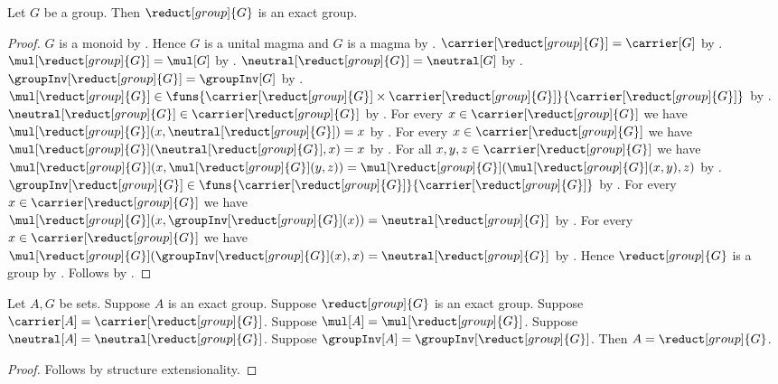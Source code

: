 \begin{theorem}\label{group_reduct_is_exact_group}
    Let $G$ be a group.
    Then $\reduct[group]{G}$ is an exact group.
\end{theorem}
\begin{proof}
    $G$ is a monoid by .
    Hence $G$ is a unital magma and $G$ is a magma by
        .
    $\carrier[\reduct[group]{G}]=\carrier[G]$ by
        .
    $\mul[\reduct[group]{G}]=\mul[G]$ by
        .
    $\neutral[\reduct[group]{G}]=\neutral[G]$ by
        .
    $\groupInv[\reduct[group]{G}]=\groupInv[G]$ by
        .
    $\mul[\reduct[group]{G}]\in
        \funs{\carrier[\reduct[group]{G}]\times
            \carrier[\reduct[group]{G}]}{
            \carrier[\reduct[group]{G}]}$ by
        .
    $\neutral[\reduct[group]{G}]\in
        \carrier[\reduct[group]{G}]$ by
        .
    For every $x\in\carrier[\reduct[group]{G}]$ we have
        $\mul[\reduct[group]{G}](x,
            \neutral[\reduct[group]{G}])=x$ by
        .
    For every $x\in\carrier[\reduct[group]{G}]$ we have
        $\mul[\reduct[group]{G}](
            \neutral[\reduct[group]{G}],x)=x$ by
        .
    For all $x,y,z\in\carrier[\reduct[group]{G}]$ we have
        $\mul[\reduct[group]{G}](x,
            \mul[\reduct[group]{G}](y,z))=
            \mul[\reduct[group]{G}](
                \mul[\reduct[group]{G}](x,y),z)$ by
        .
    $\groupInv[\reduct[group]{G}]\in
        \funs{\carrier[\reduct[group]{G}]}{
            \carrier[\reduct[group]{G}]}$ by
        .
    For every $x\in\carrier[\reduct[group]{G}]$ we have
        $\mul[\reduct[group]{G}](x,
            \groupInv[\reduct[group]{G}](x))=
            \neutral[\reduct[group]{G}]$ by
        .
    For every $x\in\carrier[\reduct[group]{G}]$ we have
        $\mul[\reduct[group]{G}](
            \groupInv[\reduct[group]{G}](x),x)=
            \neutral[\reduct[group]{G}]$ by
        .
    Hence $\reduct[group]{G}$ is a group by
        .
    Follows by .
\end{proof}

\begin{theorem}\label{exact_group_eq_exact_group_reduct}
    Let $A,G$ be sets.
    Suppose $A$ is an exact group.
    Suppose $\reduct[group]{G}$ is an exact group.
    Suppose $\carrier[A]=\carrier[\reduct[group]{G}]$.
    Suppose $\mul[A]=\mul[\reduct[group]{G}]$.
    Suppose $\neutral[A]=\neutral[\reduct[group]{G}]$.
    Suppose $\groupInv[A]=\groupInv[\reduct[group]{G}]$.
    Then $A=\reduct[group]{G}$.
\end{theorem}
\begin{proof}
    Follows by structure extensionality.
\end{proof}

